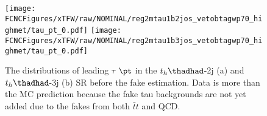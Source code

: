 \begin{figure}[H]
\centering
\texttt{[image: \\FCNCFigures/xTFW/raw/NOMINAL/reg2mtau1b2jos\_vetobtagwp70\_highmet/tau\_pt\_0.pdf]}
\texttt{[image: \\FCNCFigures/xTFW/raw/NOMINAL/reg2mtau1b3jos\_vetobtagwp70\_highmet/tau\_pt\_0.pdf]}
\caption{ The distributions of leading $\tau$ $\pt$ in the $t_h\thadhad$-2j (a) and $t_h\thadhad$-3j (b) SR before the fake estimation. Data is more than the MC prediction because the fake tau backgrounds are not yet added due to the fakes from both $\bar{t}t$ and QCD.}
\label{fig:intro_os_pre_hadhad}
\end{figure}
